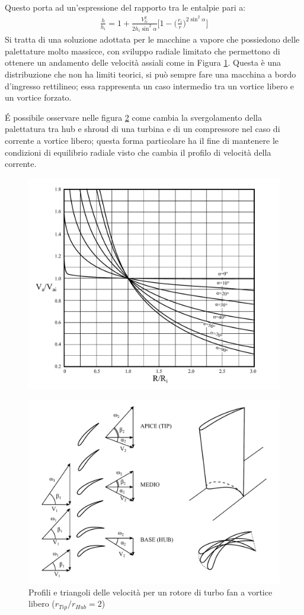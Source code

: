 Questo porta ad un'espressione del rapporto tra le entalpie pari a:
\begin{align*}
\boxed{ \frac{h}{h_i} =  1+ \frac{V_{ti}^2}{2 h_i \sin^2 \alpha} \bigg[1- \bigg(\frac{r_i}{r} \bigg) ^{2 \sin^2 \alpha} \bigg]}
\end{align*}
Si tratta di una soluzione adottata per le macchine a vapore che possiedono delle palettature molto massicce, con sviluppo radiale limitato che permettono di ottenere un andamento delle velocità assiali come in Figura \ref{fig:AngPalCost}. Questa è una distribuzione che non ha limiti teorici, si può sempre fare una macchina a bordo d'ingresso rettilineo; essa rappresenta un caso intermedio tra un vortice libero e un vortice forzato.

\'E possibile osservare nelle figura \ref{fig:TurboFan1} come cambia la svergolamento della palettatura tra hub e shroud di una turbina e di un compressore nel caso di corrente a vortice libero; questa forma particolare ha il fine di mantenere le condizioni di equilibrio radiale visto che cambia il profilo di velocità della corrente.
\begin{figure}
\centering
  \includegraphics[width=.8\textwidth]{fig/AngPalCost.pdf}
\caption{}
\label{fig:AngPalCost}
\end{figure}
\begin{figure}
\centering
  \includegraphics[width=.8\textwidth]{fig/TurboFan.pdf}
\caption{Profili e triangoli delle velocità per un rotore di turbo fan a vortice libero ($r_{Tip}/r_{Hub} =2$)}
\label{fig:TurboFan1}
\end{figure}
